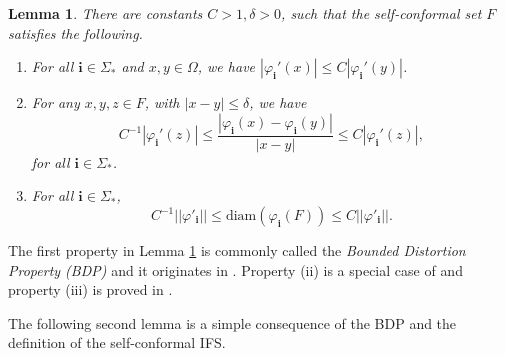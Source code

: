 \documentclass{PRM}
\newcommand{\norm}[1]{\left|\left|#1\right|\right|}
\newcommand{\diam}{\mathrm{diam}}
\theoremstyle{plain}
\newtheorem{lemma}[thm]{Lemma}
\theoremstyle{definition}
\theoremstyle{remark}
\begin{document}
\begin{lemma}\label{lemma:BDP}
There are constants $C>1,\delta>0$, such that the self-conformal set $F$ satisfies the following.

\begin{enumerate}
    \item For all $\mathbf{i}\in\Sigma_*$ and $x,y\in \Omega$, we have $|\varphi_{\mathbf{i}}'(x)|\leq C|\varphi_{\mathbf{i}}'(y)|$.
    
    \item For any $x,y,z\in F$, with $|x-y|\leq \delta$, we have
    \begin{equation*}
        C^{-1}|\varphi_{\mathbf{i}}'(z)|\leq\frac{|\varphi_{\mathbf{i}}(x)-\varphi_{\mathbf{i}}(y)|}{|x-y|}\leq C|\varphi_{\mathbf{i}}'(z)|,
    \end{equation*}
    for all $\mathbf{i}\in\Sigma_*$.

    \item For all $\mathbf{i}\in\Sigma_*$,
    \begin{equation*}
        C^{-1}\norm{\varphi'_{\mathbf{i}}}\leq\diam(\varphi_{\mathbf{i}}(F)) \leq C\norm{\varphi'_{\mathbf{i}}}.
    \end{equation*}
\end{enumerate}
\end{lemma}
The first property in Lemma \ref{lemma:BDP} is commonly called the \emph{Bounded Distortion Property (BDP)} and it originates in \cite{MU}. Property (ii) is a special case of \cite[Lemma 2.3]{Fan} and property (iii) is proved in \cite{MU}.

The following second lemma is a simple consequence of the BDP and the definition of the self-conformal IFS.
\end{document}
